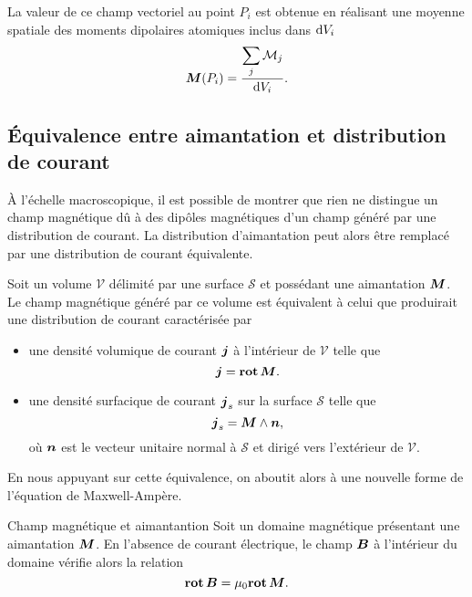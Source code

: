 La valeur de ce champ vectoriel au point $P_i$ est obtenue en réalisant une
moyenne spatiale des moments dipolaires atomiques inclus dans $\mathrm{d}V_i$
\begin{equation*}
	\vecM(P_i) = \dfrac{\displaystyle{\sum_j \mathcal{M}_j}}{\dV_i}.
\end{equation*}

\subsection{Équivalence entre aimantation et distribution de courant}
À l'échelle macroscopique, il est possible de montrer que rien ne distingue 
un champ magnétique dû à des dipôles magnétiques d'un champ généré par une distribution de
courant. La distribution d'aimantation peut alors être remplacé par une distribution de 
courant équivalente.

Soit un volume $\mathcal{V}$ délimité par une surface $\mathcal{S}$ et
possédant une aimantation $\vecM$. Le champ magnétique généré par ce volume
est équivalent à celui que produirait une distribution de courant caractérisée
par
\begin{itemize}
	\item une densité volumique de courant $\vecj$ à l'intérieur
	  de $\mathcal{V}$ telle que
	  \begin{equation}
		  \vecj = \rot \vecM.
	  \end{equation}
       \item une densité surfacique de courant $\vecj_s$ sur la surface
	 $\mathcal{S}$ telle que
	 \begin{equation}
		 \vecj_s = \vecM \wedge \vecn,
	\end{equation}
	où $\vecn$ est le vecteur unitaire normal à $\mathcal{S}$ et dirigé
	vers l'extérieur de $\mathcal{V}$.
\end{itemize}

En nous appuyant sur cette équivalence, on aboutit alors à une
nouvelle forme de l'équation de Maxwell-Ampère.

\begin{defn}{Champ magnétique et aimantantion}
	Soit un domaine magnétique présentant une aimantation $\vecM$. En l'absence
	de courant électrique, le champ
	$\vecb$ à l'intérieur du domaine vérifie alors la relation
	\begin{equation}
		\rot \vecb = \mu_0 \rot \vecM.
	\end{equation}
\end{defn}

